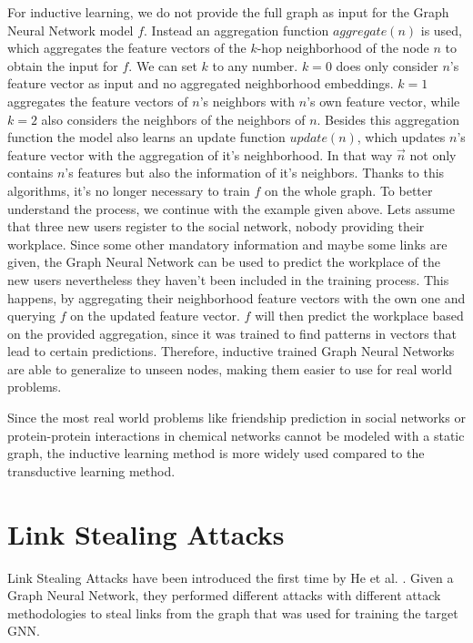       For inductive learning, we do not provide the full graph as input for the Graph Neural Network model $f$.
      Instead an aggregation function $aggregate(n)$ is used, which aggregates the feature vectors of the $k$-hop neighborhood of the node $n$ to obtain the input for $f$. 
      We can set $k$ to any number.
      $k = 0$ does only consider $n$'s feature vector as input and no aggregated neighborhood embeddings.
      $k = 1$ aggregates the feature vectors of $n$'s neighbors with $n$'s own feature vector, while $k = 2$ also considers the neighbors of the neighbors of $n$.
      Besides this aggregation function the model also learns an update function $update(n)$, which updates $n$'s feature vector with the aggregation of it's neighborhood.
      In that way $\overrightarrow{n}$ not only contains $n$'s features but also the information of it's neighbors.
      Thanks to this algorithms, it's no longer necessary to train $f$ on the whole graph.
      To better understand the process, we continue with the example given above.
      Lets assume that three new users register to the social network, nobody providing their workplace.
      Since some other mandatory information and maybe some links are given, the Graph Neural Network can be used to predict the workplace of the new users nevertheless they haven't been included in the training process.
      This happens, by aggregating their neighborhood feature vectors with the own one and querying $f$ on the updated feature vector.
      $f$ will then predict the workplace based on the provided aggregation, since it was trained to find patterns in vectors that lead to certain predictions.
      Therefore, inductive trained Graph Neural Networks are able to generalize to unseen nodes, making them easier to use for real world problems.
      
      Since the most real world problems like friendship prediction in social networks or protein-protein interactions in chemical networks cannot be modeled with a static graph, the inductive learning method is more widely used compared to the transductive learning method.
      
  \section{Link Stealing Attacks}
    
    Link Stealing Attacks have been introduced the first time by He et al. \cite{DBLP:journals/corr/abs-2005-02131}.
    Given a Graph Neural Network, they performed different attacks with different attack methodologies to steal links from the graph that was used for training the target GNN.

